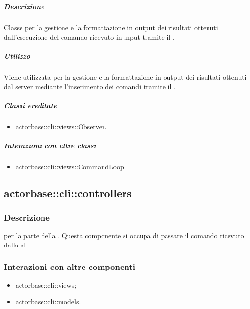 \documentclass{scalatekids-article}
\begin{document}
\subparagraph{Descrizione}

Classe per la gestione e la formattazione in output dei risultati ottenuti
dall'esecuzione del comando ricevuto in input tramite il  .

\subparagraph{Utilizzo}

Viene utilizzata per la gestione e la formattazione in output dei risultati
ottenuti dal server mediante l'inserimento dei comandi tramite il
 .

\subparagraph{Classi ereditate}

\begin{itemize}
\item \hyperref[sec:actorbase::cli::views::Observer]{actorbase::cli::views::Observer}.
\end{itemize}

\subparagraph{Interazioni con altre classi}

\begin{itemize}
\item \hyperref[sec:actorbase::cli::views::CommandLoop]{actorbase::cli::views::CommandLoop}.
\end{itemize}

\subsection{actorbase::cli::controllers}
\label{sec:actorbase::cli::controllers}

\subsubsection{Descrizione}

 per la parte  della . Questa
componente si occupa di passare il comando ricevuto dalla  al
.

\subsubsection{Interazioni con altre componenti}

\begin{itemize}
\item \hyperref[sec:actorbase::cli::views]{actorbase::cli::views};
\item \hyperref[sec:actorbase::cli::models]{actorbase::cli::models}.
\end{itemize}
\end{document}
